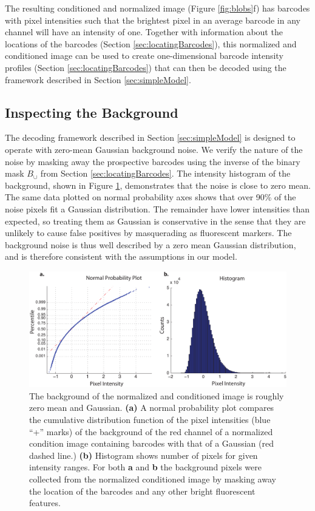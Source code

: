 The resulting conditioned and normalized image (Figure \ref{fig:blobs}f) has barcodes with pixel intensities such that the brightest pixel in an average barcode in any channel will have an intensity of one.  Together with information about the locations of the barcodes (Section \ref{sec:locatingBarcodes}), this normalized and conditioned image can be used to create one-dimensional barcode intensity profiles (Section \ref{sec:locatingBarcodes}) that can then be decoded using the framework described in Section \ref{sec:simpleModel}.

\subsection{Inspecting the Background}
The decoding framework described in Section \ref{sec:simpleModel} is designed to operate with zero-mean Gaussian background noise. We verify the nature of the noise by masking away the prospective barcodes using the inverse of the binary mask $B_{\cup}$ from Section \ref{sec:locatingBarcodes}.  The intensity histogram of the background, shown in Figure \ref{fig:noisePlots}, demonstrates that the noise is close to zero mean. The same data plotted on normal probability axes shows that over 90\% of the noise pixels fit a Gaussian distribution. The remainder have lower intensities than expected, so treating them as Gaussian is conservative in the sense that they are unlikely to cause false positives by masquerading as fluorescent markers. The background noise is thus well described by a zero mean Gaussian distribution, and is therefore consistent with the assumptions in our model.
\begin{figure}[htbp]
\begin{center}
	\includegraphics[width=\textwidth]{figures/theoryBackgroundStatistics}
	\caption{The background of the normalized and conditioned image is roughly zero mean and Gaussian.  \textbf{(a)} A normal probability plot compares the cumulative distribution function of the pixel intensities (blue ``+'' marks) of the background of the red channel of a normalized condition image containing barcodes  with that of a Gaussian (red dashed line.)  \textbf{(b)} Histogram shows number of pixels for given intensity ranges. For both \textbf{a} and \textbf{b} the background pixels were collected from the normalized conditioned image by masking away the location of the barcodes and any other bright fluorescent features.   \label{fig:noisePlots}}
\end{center}	
\end{figure}


